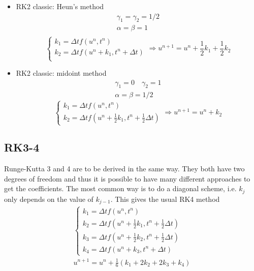 \documentclass[12pt, openany]{report}
\theoremstyle{definition}
\begin{document}
\begin{itemize}
	\item RK2 classic: Heun's method
	\begin{equation}
		\begin{aligned}
			\gamma_1 = \gamma_2 = 1/2 \\
			\alpha = \beta = 1\\
		\end{aligned}
	\end{equation}
	\begin{equation}
		\begin{cases}
			k_1 = \Delta t f(u^n,t^n)\\
			k_2 = \Delta t f(u^n + k_1, t^n + \Delta t)\\
		\end{cases} \Longrightarrow u^{n+1} = u^n + \frac{1}{2}k_1 + \frac{1}{2}k_2
	\end{equation}
	\item RK2 classic: midoint method
	\begin{equation}
		\begin{aligned}
			\gamma_1 = 0 \quad \gamma_2 = 1\\
			\alpha = \beta = 1/2
		\end{aligned}
	\end{equation}
	\begin{equation}
		\begin{cases}
			k_1 = \Delta t f(u^n,t^n)\\
			k_2 = \Delta t f(u^n + \frac{1}{2}k_1, t^n + \frac{1}{2}\Delta t)
		\end{cases} \Longrightarrow u^{n+1} = u^n + k_2 
	\end{equation}
\end{itemize}
\subsection{RK3-4}
Runge-Kutta 3 and 4 are to be derived in the same way. They both have two degrees of freedom and thus it is possible to have many different approaches to get the coefficients. The most common way is to do a diagonal scheme, i.e. $k_{j}$ only depends on the value of $k_{j-1}$. This gives the usual RK4 method 
\begin{equation}
	\begin{aligned}
		\begin{cases}
			k_1 = \Delta t f(u^n, t^n)\\
			k_2 = \Delta t f(u^n + \frac{1}{2}k_1, t^n + \frac{1}{2}\Delta t)\\
			k_3 = \Delta t f(u^n + \frac{1}{2}k_2, t^n + \frac{1}{2}\Delta t)\\
			k_4 = \Delta t f(u^n + k_3, t^n + \Delta t)
		\end{cases}\\
		u^{n+1} = u^n + \frac{1}{6}\left(k_1 + 2k_2+2k_3+k_4\right)
	\end{aligned}
\end{equation}
\end{document}

